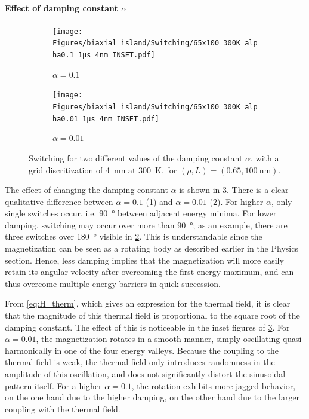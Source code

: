 \documentclass[11pt,a4paper,english]{article}
\begin{document}
\paragraph{Effect of damping constant $\alpha$}
\begin{figure}
     \centering
     \begin{subfigure}[b]{0.8\textwidth}
         \centering
         \texttt{[image: Figures/biaxial\_island/Switching/65x100\_300K\_alpha0.1\_1µs\_4nm\_INSET.pdf]}
         \caption{$\alpha=0.1$}
         \label{fig:switching-alpha-0.1}
     \end{subfigure}
     \hfill
     \begin{subfigure}[b]{0.8\textwidth}
         \centering
         \texttt{[image: Figures/biaxial\_island/Switching/65x100\_300K\_alpha0.01\_1µs\_4nm\_INSET.pdf]}
         \caption{$\alpha = 0.01$}
         \label{fig:switching-alpha-0.01}
     \end{subfigure}
        \caption{Switching for two different values of the damping constant $\alpha$, with a grid discritization of \SI{4}{\nano\metre} at \SI{300}{\kelvin}, for $(\rho, L) = (0.65, \SI{100}{\nano\metre})$.}
        \label{fig:switching-alpha}
\end{figure}
The effect of changing the damping constant $\alpha$ is shown in \cref{fig:switching-alpha}. There is a clear qualitative difference between $\alpha=0.1$ (\cref{fig:switching-alpha-0.1}) and $\alpha=0.01$ (\cref{fig:switching-alpha-0.01}). For higher $\alpha$, only single switches occur, i.e. \SI{90}{\degree} between adjacent energy minima. For lower damping, switching may occur over more than \SI{90}{\degree}; as an example, there are three switches over \SI{180}{\degree} visible in \cref{fig:switching-alpha-0.01}. This is understandable since the magnetization can be seen as a rotating body as described earlier in the Physics section. Hence, less damping implies that the magnetization will more easily retain its angular velocity after overcoming the first energy maximum, and can thus overcome multiple energy barriers in quick succession. \par
From \cref{eq:H_therm}, which gives an expression for the thermal field, it is clear that the magnitude of this thermal field is proportional to the square root of the damping constant. The effect of this is noticeable in the inset figures of \cref{fig:switching-alpha}. For $\alpha=0.01$, the magnetization rotates in a smooth manner, simply oscillating quasi-harmonically in one of the four energy valleys. Because the coupling to the thermal field is weak, the thermal field only introduces randomness in the amplitude of this oscillation, and does not significantly distort the sinusoidal pattern itself. For a higher $\alpha=0.1$, the rotation exhibits more jagged behavior, on the one hand due to the higher damping, on the other hand due to the larger coupling with the thermal field. \par
\end{document}
